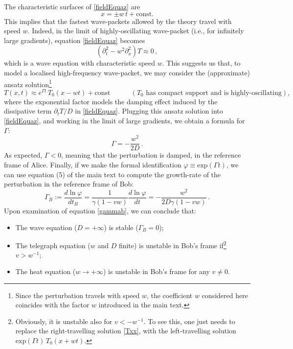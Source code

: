 \documentclass[a4paper, amsfonts, amssymb, amsmath, reprint, showkeys,  twoside, onecolumn,notitlepage,nofootinbib]{revtex4-1}
\newcommand{\spc}{\quad \quad \quad}
\theoremstyle{definition}
\theoremstyle{theorem}
\begin{document}
The characteristic surfaces of \eqref{fieldEquaz} are
\begin{equation}
x = \pm w \, t + \text{const}.
\end{equation}
This implies that the fastest wave-packets allowed by the theory travel with speed $w$. Indeed, in the limit of highly-oscillating wave-packet (i.e., for infinitely large gradients), equation \eqref{fieldEquaz} becomes
\begin{equation}
(\partial_t^2  - w^2 \partial^2_x) T \approx 0 \, ,
\end{equation}
which is a wave equation with characteristic speed $w$. This suggests us that, to model a localised high-frequency wave-packet, we may consider the (approximate) ansatz solution\footnote{Since the perturbation travels with speed $w$, the coefficient $w$ considered here coincides with the factor $w$ introduced in the main text.}
\begin{equation}\label{Txx}
T(x,t) \approx e^{\Gamma t} \, T_0(x-wt) + \text{const} \spc (T_0 \text{ has compact support and is highly-oscillating}) ,
\end{equation}
where the exponential factor models the damping effect induced by the dissipative term $\partial_t T/D$ in \eqref{fieldEquaz}. Plugging this ansatz solution into \eqref{fieldEquaz}, and working in the limit of large gradients, we obtain a formula for $\Gamma$:
\begin{equation}
\Gamma = -\dfrac{w^2}{2D} \, .
\end{equation}
As expected, $\Gamma <0$, meaning that the perturbation is damped, in the reference frame of Alice. Finally, if we make the formal identification $\varphi \equiv \text{exp}(\Gamma t)$, we can use equation (5) of the main text to compute the growth-rate of the perturbation in the reference frame of Bob:
\begin{equation}\label{gammab}
\Gamma_B := \dfrac{d \ln \varphi}{dt_B} =\dfrac{1}{\gamma(1-vw)} \dfrac{d \ln \varphi}{dt}= -\dfrac{w^2}{2D\gamma (1-vw)} \, .
\end{equation}
Upon examination of equation \eqref{gammab}, we can conclude that:
\begin{itemize}
\item The wave equation ($D=+\infty$) is stable ($\Gamma_B =0$);
\item The telegraph equation ($w$ and $D$ finite) is unstable in Bob's frame if\footnote{Obviously, it is unstable also for $v<-w^{-1}$. To see this, one just needs to replace the right-travelling solution \eqref{Txx}, with the left-travelling solution $\text{exp}(\Gamma t) \, T_0(x+wt)$.} $v>w^{-1}$;
\item The heat equation ($w\rightarrow +\infty$) is unstable in Bob's frame for any $v \neq 0$.
\end{itemize}
\end{document}
